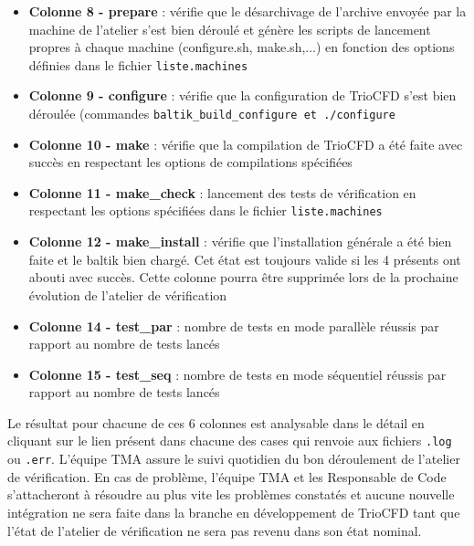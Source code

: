 \begin{itemize}[label=$\Rightarrow$, font=\LARGE]
   \item \textbf{Colonne 8 - prepare} : vérifie que le désarchivage de l'archive envoyée par la machine de l'atelier s'est bien déroulé et génère les scripts de lancement propres à chaque machine (configure.sh, make.sh,...) en fonction des options définies dans le fichier \texttt{liste.machines}
   \item \textbf{Colonne 9 - configure} : vérifie que la configuration de TrioCFD s'est bien déroulée (commandes \texttt{baltik\_build\_configure et \texttt{./configure}}
   \item \textbf{Colonne 10 - make} : vérifie que la compilation de TrioCFD a été faite avec succès en respectant les options de compilations spécifiées
   \item \textbf{Colonne 11 - make\_check} : lancement des tests de vérification en respectant les options spécifiées dans le fichier \texttt{liste.machines}
   \item \textbf{Colonne 12 - make\_install} : vérifie que l'installation générale a été bien faite et le baltik bien chargé. Cet état est toujours valide si les 4 présents ont abouti avec succès. Cette colonne pourra être supprimée lors de la prochaine évolution de l'atelier de vérification
   \item \textbf{Colonne 14 - test\_par} : nombre de tests en mode parallèle réussis par rapport au nombre de tests lancés
   \item \textbf{Colonne 15 - test\_seq} : nombre de tests en mode séquentiel réussis par rapport au nombre de tests lancés
\end{itemize}

Le résultat pour chacune de ces 6 colonnes est analysable dans le détail en cliquant sur le lien présent dans chacune des cases qui renvoie aux fichiers \texttt{.log} ou \texttt{.err}. L'équipe TMA assure le suivi quotidien du bon déroulement de l'atelier de vérification. En cas de problème, l'équipe TMA et les Responsable de Code s'attacheront à résoudre au plus vite les problèmes constatés et aucune nouvelle intégration ne sera faite dans la branche en développement de TrioCFD tant que l'état de l'atelier de vérification ne sera pas revenu dans son état nominal. 
\newpage

